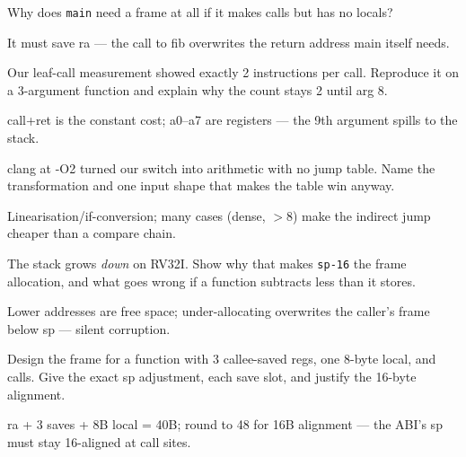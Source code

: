 \begin{exercise}[easy]\label{ex:e04h}
Why does \texttt{main} need a frame at all if it makes calls but
has no locals?
\end{exercise}
\begin{solution}[hint]
It must save ra --- the call to fib overwrites the return
address main itself needs.
\end{solution}

\begin{exercise}[medium]\label{ex:m04e}
Our leaf-call measurement showed exactly 2 instructions per call.
Reproduce it on a 3-argument function and explain why the count
stays 2 until arg 8.
\end{exercise}
\begin{solution}[hint]
call+ret is the constant cost; a0--a7 are registers --- the 9th
argument spills to the stack.
\end{solution}

\begin{exercise}[medium]\label{ex:m04f}
clang at -O2 turned our switch into arithmetic with no jump
table. Name the transformation and one input shape that makes the
table win anyway.
\end{exercise}
\begin{solution}[hint]
Linearisation/if-conversion; many cases (dense, $>$8) make the
indirect jump cheaper than a compare chain.
\end{solution}

\begin{exercise}[medium]\label{ex:m04g}
The stack grows \emph{down} on RV32I. Show why that makes
\texttt{sp-16} the frame allocation, and what goes wrong if a
function subtracts less than it stores.
\end{exercise}
\begin{solution}[hint]
Lower addresses are free space; under-allocating overwrites the
caller's frame below sp --- silent corruption.
\end{solution}

\begin{exercise}[hard]\label{ex:h04d}
Design the frame for a function with 3 callee-saved regs, one
8-byte local, and calls. Give the exact sp adjustment, each save
slot, and justify the 16-byte alignment.
\end{exercise}
\begin{solution}[hint]
ra + 3 saves + 8B local = 40B; round to 48 for 16B alignment ---
the ABI's sp must stay 16-aligned at call sites.
\end{solution}
